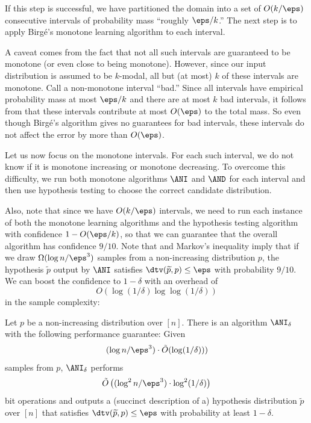 If this step is successful, we have partitioned the domain into a set of $O(k/\eps)$ consecutive intervals
of probability mass ``roughly $\eps/k$.'' {The} next step is to apply Birg{\'e}'s monotone learning algorithm
to each interval.

A caveat comes from the fact that not all such intervals are guaranteed to be
monotone (or even close to being monotone). However, since our input distribution is assumed to be $k$-modal,
all but (at most) $k$ of these intervals are monotone. Call a non-monotone interval ``bad.'' Since all intervals
have {empirical} probability mass at most $\eps / k$ and there are at most $k$ bad intervals, it follows from  that 
these intervals contribute at most {$O(\eps)$} to the total mass. So
even though Birg{\'e}'s algorithm gives no guarantees for bad intervals,
these intervals do not affect the error by more than {$O(\eps)$}.

Let us now focus on the  monotone intervals. For each such interval, we do not
know if it is monotone increasing or monotone decreasing. To overcome this
difficulty, we run both monotone algorithms $\ANI$ and $\AND$
for each interval and then use
hypothesis testing to choose the correct candidate distribution.

Also, note that since we have ${O(k/\eps)}$ intervals, we need to run each instance of both
the monotone learning algorithms and the hypothesis testing algorithm with
confidence $1-O(\eps/k)$, so that we can guarantee that the
overall algorithm has confidence $9/10$. Note that
 and Markov's inequality imply that if we
draw $\Omega(\log n / \eps^3)$ samples from a non-increasing distribution $p$,
the hypothesis $\widetilde{p}$ output by $\ANI$ satisfies
$\dtv(\widetilde{p},p) \leq \eps$ with probability $9/10$. We can boost the
confidence to $1-\delta$ with an overhead of
\[
O(\log(1/\delta) \log\log(1/\delta))
\]
in the sample complexity:

%


\begin{fact} \label{fact:birge-tournament}
Let $p$ be a non-increasing distribution over $[n]$.
There is an algorithm $\ANI_{\delta}$ with the following performance guarantee:
Given
\[
(\log n /\eps^3) \cdot \tilde{O}(\log(1/\delta)))
\]
samples from $p$, $\ANI_{\delta}$ performs
\[
\tilde{O}\left( (\log^2 n / \eps^3)\cdot \log^{2}(1/\delta) \right)
\]
bit operations
and outputs a (succinct description of a) hypothesis distribution $\widetilde{p}$ over $[n]$
that satisfies $\dtv(\widetilde{p}, p) \leq \eps$ with probability at least $1-\delta$.
\end{fact}

